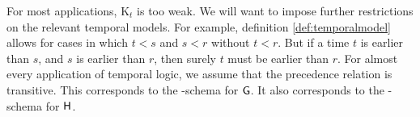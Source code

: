 \begin{solution}
\begin{sollist}
    \item {}
    \medskip
      
   \item {}
   
  \end{sollist}
  
\end{solution}

For most applications, K$_{t}$ is too weak. We will want to impose further
restrictions on the relevant temporal models. For example, definition
\ref{def:temporalmodel} allows for cases in which $t < s$ and $s < r$ without
$t < r$. But if a time $t$ is earlier than $s$, and $s$ is earlier than $r$,
then surely $t$ must be earlier than $r$. For almost every application of
temporal logic, we assume that the precedence relation is transitive. This
corresponds to the -schema for $\operatorname{\mathsf{G}}$. It also corresponds to the
-schema for $\operatorname{\mathsf{H}}$.
\begin{principles}
  \\
\end{principles}

